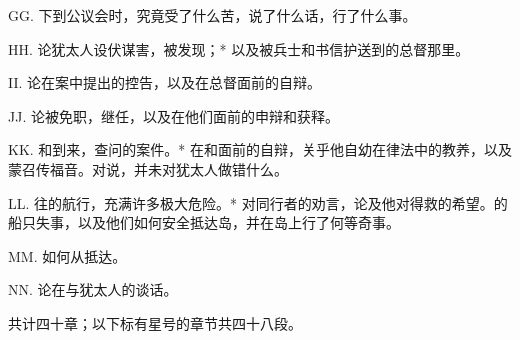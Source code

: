 GG. 下到公议会时，究竟受了什么苦，说了什么话，行了什么事。\par

HH. 论犹太人设伏谋害，被发现；* 以及被兵士和书信护送到的总督那里。\par

II. 论在案中提出的控告，以及在总督面前的自辩。\par

JJ. 论被免职，继任，以及在他们面前的申辩和获释。\par

KK. 和到来，查问的案件。* 在和面前的自辩，关乎他自幼在律法中的教养，以及蒙召传福音。对说，并未对犹太人做错什么。\par

LL. 往的航行，充满许多极大危险。* 对同行者的劝言，论及他对得救的希望。的船只失事，以及他们如何安全抵达岛，并在岛上行了何等奇事。\par

MM. 如何从抵达。\par

NN. 论在与犹太人的谈话。\par

共计四十章；以下标有星号的章节共四十八段。\par

